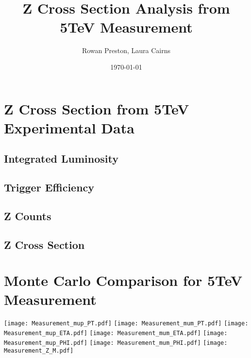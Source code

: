 \documentclass[a4paper]{article}
\title{Z Cross Section Analysis from 5TeV Measurement}
\author{Rowan Preston, Laura Cairns}
\date{\today}
\begin{document}
\maketitle

\section{Z Cross Section from 5TeV Experimental Data}

\subsection{Integrated Luminosity}


\subsection{Trigger Efficiency}


\subsection{Z Counts}


\subsection{Z Cross Section}




\section{Monte Carlo Comparison for 5TeV Measurement}

\texttt{[image: Measurement\_mup\_PT.pdf]}
\texttt{[image: Measurement\_mum\_PT.pdf]}
\texttt{[image: Measurement\_mup\_ETA.pdf]}
\texttt{[image: Measurement\_mum\_ETA.pdf]}
\texttt{[image: Measurement\_mup\_PHI.pdf]}
\texttt{[image: Measurement\_mum\_PHI.pdf]}
\texttt{[image: Measurement\_Z\_M.pdf]}



{}

\end{document}

